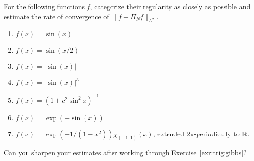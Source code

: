 \begin{exercise} \label{exr:trig:functions}
  For the following functions $f$, categorize their regularity as closely as
  possible and estimate the rate of convergence of $\|f-\Pi_N f\|_{L^2}$.
  \begin{enumerate} \ilist
    \item  $f(x) = \sin(x)$
    \item  $f(x) = \sin(x/2)$
    \item $f(x) = |\sin(x)|$
    \item $f(x) = |\sin(x)|^3$
    \item $f(x) = (1 + c^2 \sin^2 x)^{-1}$
    \item $f(x) = \exp( - \sin(x))$
    \item $f(x) = \exp( - 1 / (1-x^2) ) \chi_{(-1,1)}(x)$, extended $2\pi$-periodically to $\mathbb{R}$.
  \end{enumerate}
  Can you sharpen your estimates after working through
  Exercise~\ref{exr:trig:gibbs}?
\end{exercise}


